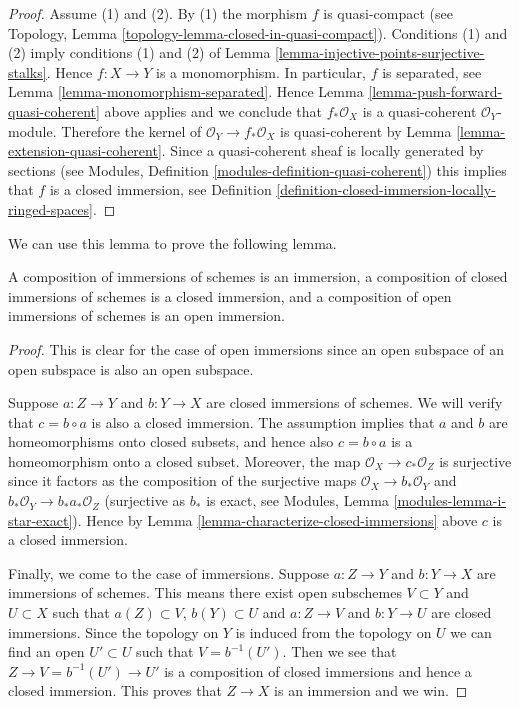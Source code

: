 \begin{proof}
Assume (1) and (2). By (1) the morphism $f$ is quasi-compact
(see Topology, Lemma \ref{topology-lemma-closed-in-quasi-compact}).
Conditions (1) and (2) imply conditions (1) and (2) of
Lemma \ref{lemma-injective-points-surjective-stalks}.
Hence $f : X \to Y$ is a monomorphism. In particular, $f$
is separated, see Lemma \ref{lemma-monomorphism-separated}.
Hence Lemma \ref{lemma-push-forward-quasi-coherent}
above applies and we conclude that $f_*\mathcal{O}_X$ is a quasi-coherent
$\mathcal{O}_Y$-module. Therefore the kernel of
$\mathcal{O}_Y \to f_*\mathcal{O}_X$ is quasi-coherent
by Lemma \ref{lemma-extension-quasi-coherent}. Since a quasi-coherent
sheaf is locally generated by sections (see
Modules, Definition \ref{modules-definition-quasi-coherent})
this implies that $f$ is a closed immersion, see
Definition \ref{definition-closed-immersion-locally-ringed-spaces}.
\end{proof}

\noindent
We can use this lemma to prove the following lemma.

\begin{lemma}
\label{lemma-composition-immersion}
A composition of immersions of schemes is an immersion,
a composition of closed immersions of schemes is a closed immersion, and
a composition of open immersions of schemes is an open immersion.
\end{lemma}

\begin{proof}
This is clear for the case of open immersions since an open subspace of
an open subspace is also an open subspace.

\medskip\noindent
Suppose $a : Z \to Y$ and $b : Y \to X$ are closed immersions of schemes.
We will verify that $c = b \circ a$ is also a closed immersion.
The assumption implies that $a$ and $b$ are homeomorphisms onto closed subsets,
and hence also $c = b \circ a$ is a homeomorphism onto a closed subset.
Moreover, the map $\mathcal{O}_X \to c_*\mathcal{O}_Z$ is surjective
since it factors as the composition of the surjective maps
$\mathcal{O}_X \to b_*\mathcal{O}_Y$ and
$b_*\mathcal{O}_Y \to b_*a_*\mathcal{O}_Z$ (surjective as $b_*$ is exact,
see Modules, Lemma \ref{modules-lemma-i-star-exact}).
Hence by Lemma \ref{lemma-characterize-closed-immersions}
above $c$ is a closed immersion.

\medskip\noindent
Finally, we come to the case of immersions.
Suppose $a : Z \to Y$ and $b : Y \to X$ are immersions of schemes.
This means there exist open subschemes
$V \subset Y$ and $U \subset X$ such that
$a(Z) \subset V$, $b(Y) \subset U$ and $a : Z \to V$
and $b : Y \to U$ are closed immersions.
Since the topology on $Y$ is induced from the topology on
$U$ we can find an open $U' \subset U$ such that
$V = b^{-1}(U')$. Then we see that
$Z \to V = b^{-1}(U') \to U'$ is a composition of
closed immersions and hence a closed immersion.
This proves that $Z \to X$ is an immersion and we win.
\end{proof}


















